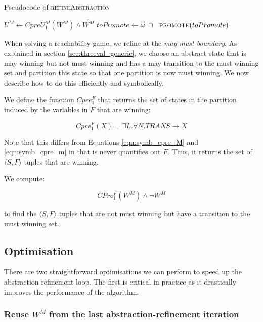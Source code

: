 \begin{algorithm}

\caption{Pseudocode of \textsc{refineAbstraction}}
\label{alg:refineAbstraction}

\begin{algorithmic}[1]
    \State $U^M \gets CpreU_1^M(W^M) \land \overline{W^M}$
    \State $toPromote \gets \vec{\omega}~\cap~$
    \State $\Call{promote}{toPromote}$
\EndFunction
\end{algorithmic}
\end{algorithm}

When solving a reachability game, we refine at the \emph{may-must boundary}. As explained in section \ref{sec:threeval_generic}, we choose an abstract state that is may winning but not must winning and has a may transition to the must winning set and partition this state so that one partition is now must winning. We now describe how to do this efficiently and symbolically.

We define the function $Cpre_1^F$ that returns the set of states in the partition induced by the variables in $F$ that are winning:

\begin{equation}
    Cpre_1^F(X) = \exists L. \forall N. TRANS \rightarrow X
\end{equation}

Note that this differs from Equations \ref{eqn:symb_cpre_M} and \ref{eqn:symb_cpre_m} in that is never quantifies out $F$. Thus, it returns the set of $\langle S, F \rangle$ tuples that are winning.

We compute:

\begin{equation}
    CPre_1^F(W^M) \wedge \neg W^M
\end{equation}

\noindent to find the $\langle S, F \rangle$ tuples that are not must winning but have a transition to the must winning set.

\subsection{Optimisation}

There are two straightforward optimisations we can perform to speed up the abstraction refinement loop. The first is critical in practice as it drastically improves the performance of the algorithm.

\subsubsection{Reuse $W^M$ from the last abstraction-refinement iteration}

